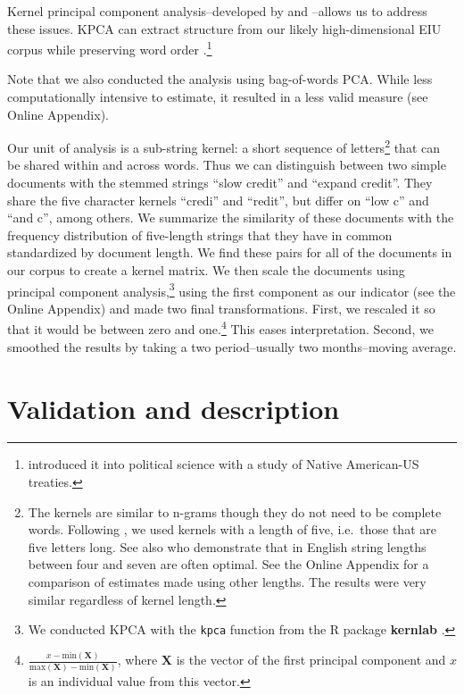 \documentclass[]{article}
\begin{document}
Kernel principal component analysis--developed by \cite{Scholkopf1998} and \cite{lodhi2002}--allows us to address these issues. KPCA can extract structure from our likely high-dimensional EIU corpus while preserving word order \cite[6531--6537]{Zhang2010}.\footnote{\cite{Spirling2012} introduced it into political science with a study of Native American-US treaties.}

Note that we also conducted the analysis using bag-of-words PCA. While less computationally intensive to estimate, it resulted in a less valid measure (see Online Appendix).

Our unit of analysis is a sub-string kernel: a short sequence of letters\footnote{The kernels are similar to n-grams though they do not need to be complete words. Following \cite{Spirling2012}, we used kernels with a length of five, i.e.~those that are five letters long. See also \cite{lodhi2002} who demonstrate that in English string lengths between four and seven are often optimal. See the Online Appendix for a comparison of estimates made using other lengths. The results were very similar regardless of kernel length.} that can be shared within and across words. Thus we can distinguish between two simple documents with the stemmed strings ``slow credit'' and ``expand credit''. They share the five character kernels ``credi'' and ``redit'', but differ on ``low c'' and ``and c'', among others. We summarize the similarity of these documents with the frequency distribution of five-length strings that they have in common standardized by document length. We find these pairs for all of the documents in our corpus to create a kernel matrix. We then scale the documents using principal component analysis,\footnote{We conducted KPCA with the \texttt{kpca} function from the R package \textbf{kernlab} \citep{kerblabCite}.} using the first component as our indicator (see the Online Appendix) and made two final transformations. First, we rescaled it so that it would be between zero and one.\footnote{\(\frac{x - \mathrm{min}(\bm{X})}{\mathrm{max}(\bm{X}) - \mathrm{min}(\bm{X})}\),
  where \(\bm{X}\) is the vector of the first principal component and
  \(x\) is an individual value from this vector.} This eases
interpretation. Second, we smoothed the results by taking a two period--usually two months--moving average.

\section{Validation and description}\label{results}
\end{document}
